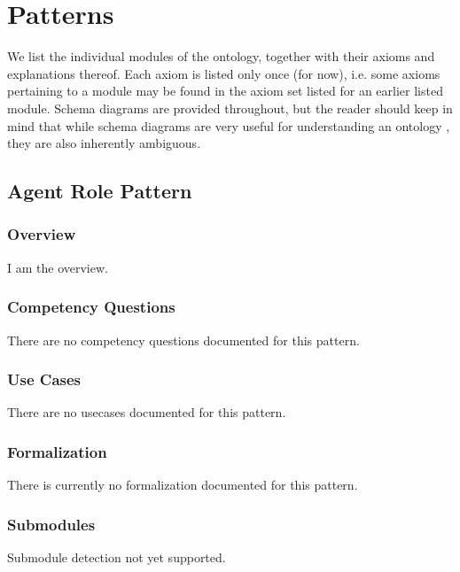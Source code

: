 \chapter{Patterns}
\label{sec:mods}
We list the individual modules of the ontology, together with their axioms and explanations thereof. Each axiom is listed only once (for now), i.e. some axioms pertaining to a module may be found in the axiom set listed for an earlier listed module. Schema diagrams are provided throughout, but the reader should keep in mind that while schema diagrams are very useful for understanding an ontology \cite{odp-documentation}, they are also inherently ambiguous.

\section{Agent Role Pattern}
\label{sec:agent-role-pattern}
\subsection{Overview}
\label{ssec:overview}
I am the overview.

\subsection{Competency Questions}
\label{ssec:cqs}
There are no competency questions documented for this pattern.

\subsection{Use Cases}
\label{ssec:use-cases}
There are no usecases documented for this pattern.
\subsection{Formalization}
\label{ssec:formalization}
There is currently no formalization documented for this pattern.

\subsection{Submodules}
\label{ssec:submodules}
Submodule detection not yet supported.

